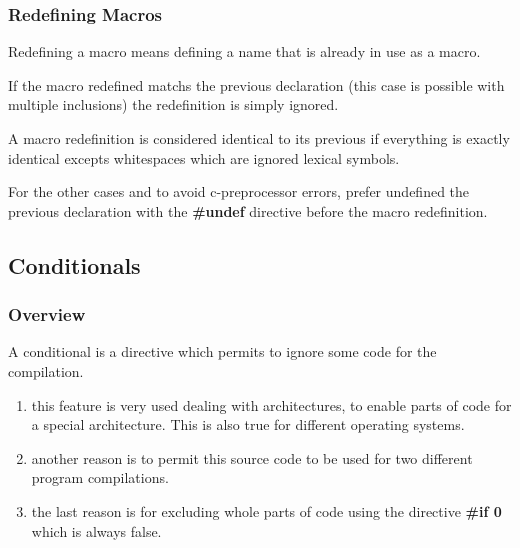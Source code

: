 \begin{frame}
  \frametitle{Redefining Macros}

  Redefining a macro means defining a name that is already in use as a macro.

  \nl

  If the macro redefined matchs the previous declaration (this case is possible
  with multiple inclusions) the redefinition is simply ignored.

  \nl

  A macro redefinition is considered identical to its previous if everything is
  exactly identical excepts whitespaces which are ignored lexical symbols.

  \nl

  For the other cases and to avoid c-preprocessor errors, prefer
  undefined the previous declaration with the \textbf{\#undef} directive
  before the macro redefinition.
\end{frame}

%
%

\subsection{Conditionals}


\begin{frame}
  \frametitle{Overview}

  A conditional is a directive which permits to ignore some code for the
  compilation.

  \begin{enumerate}
    \item
      this feature is very used dealing with architectures, to enable
      parts of code for a special architecture. This is also true for
      different operating systems.
    \item
      another reason is to permit this source code to be used for
      two different program compilations.
    \item
      the last reason is for excluding whole parts of code using the
      directive \textbf{\#if 0} which is always false.
  \end{enumerate}
\end{frame}


